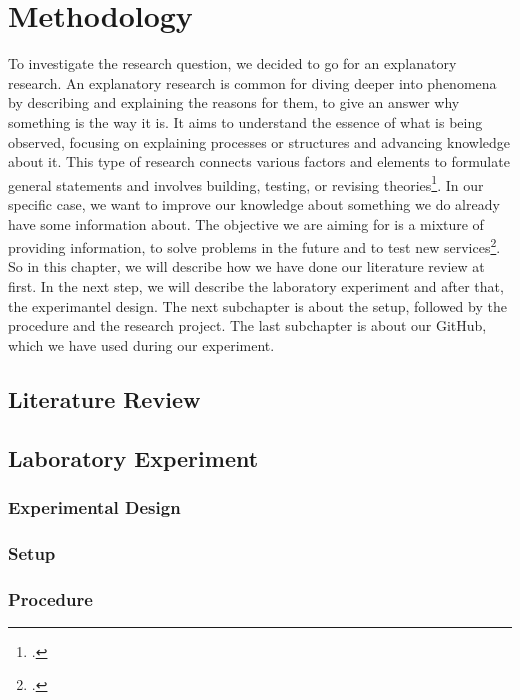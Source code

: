 \newpage

\section{Methodology} \label{methodology}
To investigate the research question, we decided to go for an explanatory research. An explanatory research is common for diving deeper into phenomena by describing and explaining the reasons for them, to give an answer why something is the way it is.  It aims to understand the essence of what is being observed, focusing on explaining processes or structures and advancing knowledge about it. This type of research connects various factors and elements to formulate general statements and involves building, testing, or revising theories\footcite[p.2]{adams_research_2014}.
In our specific case, we want to improve our knowledge about something we do already have some information about. The objective we are aiming for is a mixture of providing information, to solve problems in the future and to test new services\footcite[p.3]{adams_research_2014}.
So in this chapter, we will describe how we have done our literature review at first. In the next step, we will describe the laboratory experiment and after that, the experimantel design. The next subchapter is about the setup, followed by the procedure and the research project.
The last subchapter is about our GitHub, which we have used during our experiment. 
\subsection{Literature Review} \label{literature_review}

\subsection{Laboratory Experiment} \label{laboratory_experiment}
\subsubsection{Experimental Design} \label{experimental_design}

\subsubsection{Setup} \label{setup}

\subsubsection{Procedure} \label{procedure}

